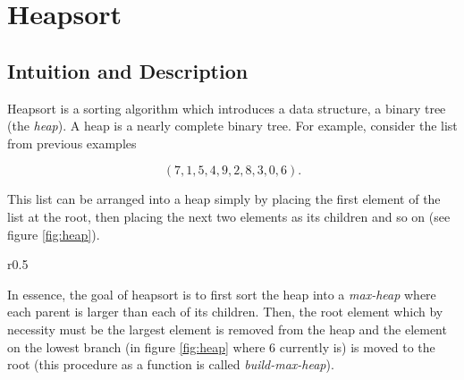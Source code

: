 \section{Heapsort}
\subsection{Intuition and Description}
Heapsort is a sorting algorithm which introduces a data structure, a binary tree (the \textit{heap}). A heap is a nearly complete binary tree. For example, consider the list from previous examples

\begin{equation*}
    (7, 1, 5, 4, 9, 2, 8, 3, 0, 6) \text{.}
\end{equation*}

This list can be arranged into a heap simply by placing the first element of the list at the root, then placing the next two elements as its children and so on (see figure \ref{fig:heap}).
\begin{wrapfigure}{r}{0.5\textwidth}
    \caption{the given list arranged into a heap}\label{fig:heap}
\end{wrapfigure}

In essence, the goal of heapsort is to first sort the heap into a \textit{max-heap} where each parent is larger than each of its children. Then, the root element which by necessity must be the largest element is removed from the heap and the element on the lowest branch (in figure \ref{fig:heap} where 6 currently is) is moved to the root (this procedure as a function is called \textit{build-max-heap}).

